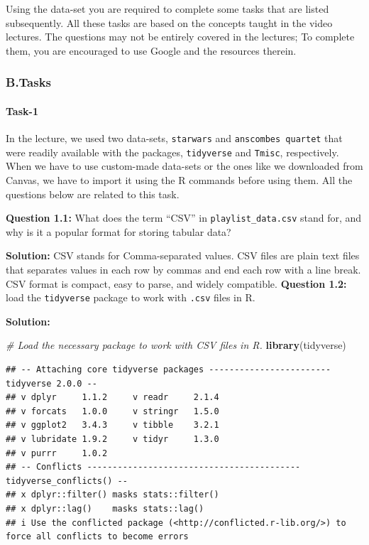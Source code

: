 \documentclass[
]{article}
\newenvironment{Shaded}{\begin{snugshade}}{\end{snugshade}}
\newcommand{\CommentTok}[1]{\textcolor[rgb]{0.56,0.35,0.01}{\textit{#1}}}
\newcommand{\FunctionTok}[1]{\textcolor[rgb]{0.13,0.29,0.53}{\textbf{#1}}}
\newcommand{\NormalTok}[1]{#1}
\begin{document}
Using the data-set you are required to complete some tasks that are
listed subsequently. All these tasks are based on the concepts taught in
the video lectures. The questions may not be entirely covered in the
lectures; To complete them, you are encouraged to use Google and the
resources therein.

\hypertarget{b.tasks}{%
\subsubsection{B.Tasks}\label{b.tasks}}

\hypertarget{task-1}{%
\paragraph{Task-1}\label{task-1}}

In the lecture, we used two data-sets, \texttt{starwars} and
\texttt{anscombe\textquotesingle{}s\ quartet} that were readily
available with the packages, \texttt{tidyverse} and \texttt{Tmisc},
respectively. When we have to use custom-made data-sets or the ones like
we downloaded from Canvas, we have to import it using the R commands
before using them. All the questions below are related to this task.

\textbf{Question 1.1:} What does the term ``CSV'' in
\texttt{playlist\_data.csv} stand for, and why is it a popular format
for storing tabular data?

\textbf{Solution:} CSV stands for Comma-separated values. CSV files are
plain text files that separates values in each row by commas and end
each row with a line break. CSV format is compact, easy to parse, and
widely compatible. \textbf{Question 1.2:} load the \texttt{tidyverse}
package to work with \texttt{.csv} files in R.

\textbf{Solution:}

\begin{Shaded}
\begin{Highlighting}[]
\CommentTok{\# Load the necessary package to work with CSV files in R.}
\FunctionTok{library}\NormalTok{(tidyverse)}
\end{Highlighting}
\end{Shaded}

\begin{verbatim}
## -- Attaching core tidyverse packages ------------------------ tidyverse 2.0.0 --
## v dplyr     1.1.2     v readr     2.1.4
## v forcats   1.0.0     v stringr   1.5.0
## v ggplot2   3.4.3     v tibble    3.2.1
## v lubridate 1.9.2     v tidyr     1.3.0
## v purrr     1.0.2     
## -- Conflicts ------------------------------------------ tidyverse_conflicts() --
## x dplyr::filter() masks stats::filter()
## x dplyr::lag()    masks stats::lag()
## i Use the conflicted package (<http://conflicted.r-lib.org/>) to force all conflicts to become errors
\end{verbatim}
\end{document}
